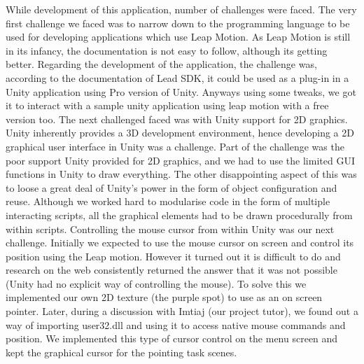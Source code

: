 \documentclass[titlepage]{article}
\begin{document}
While development of this application, number of challenges were faced. The very first challenge we faced was to narrow down to the programming language to be used for developing applications which use Leap Motion. As Leap Motion is still in its infancy, the documentation is not easy to follow, although its getting better. Regarding the development of the application, the challenge was, according to the documentation of Lead SDK, it could be used as a plug-in in a Unity application using Pro version of Unity. Anyways using some tweaks, we got it to interact with a sample unity application using leap motion with a free version too. The next challenged faced was with Unity support for 2D graphics. Unity inherently provides a 3D development environment, hence developing a 2D graphical user interface in Unity was a challenge. Part of the challenge was the poor support Unity provided for 2D graphics, and we had to use the limited GUI functions in Unity to draw everything. The other disappointing aspect of this was to loose a great deal of Unity's power in the form of object configuration and reuse. Although we worked hard to modularise code in the form of multiple interacting scripts, all the graphical elements had to be drawn procedurally from within scripts. Controlling the mouse cursor from within Unity was our next challenge. Initially we expected to use the mouse cursor on screen and control its position using the Leap motion. However it turned out it is difficult to do and research on the web consistently returned the answer that it was not possible (Unity had no explicit way of  controlling the mouse). To solve this we implemented our own 2D texture (the purple spot) to use as an on screen pointer. Later, during a discussion with Imtiaj  (our project tutor), we found out a way of importing user32.dll and using it to access native mouse commands and position. We implemented this type of cursor control on the menu screen and kept the graphical cursor for the pointing task scenes.
\end{document}

